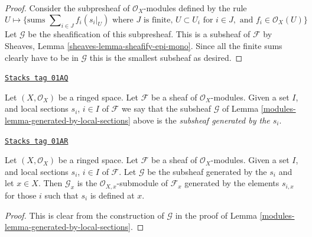 \begin{proof}
Consider the subpresheaf of $\mathcal{O}_X$-modules
defined by the rule
$$
U
\longmapsto
\{
\text{sums } \sum\nolimits_{i \in J} f_i (s_i|_U)
\text{ where } J \text{ is finite, }
U \subset U_i \text{ for } i\in J, \text{ and }
f_i \in \mathcal{O}_X(U)
\}
$$
Let $\mathcal{G}$ be the sheafification of this subpresheaf.
This is a subsheaf of $\mathcal{F}$ by
Sheaves, Lemma \ref{sheaves-lemma-sheafify-epi-mono}.
Since all the finite sums clearly have to be in $\mathcal{G}$
this is the smallest subsheaf as desired.
\end{proof}

\begin{definition}
\label{modules-definition-generated-by-local-sections}
\href{https://stacks.math.columbia.edu/tag/01AQ}{\texttt{Stacks tag 01AQ}}

Let $(X, \mathcal{O}_X)$ be a ringed space.
Let $\mathcal{F}$ be a sheaf of $\mathcal{O}_X$-modules.
Given a set $I$, and
local sections $s_i$, $i \in I$ of $\mathcal{F}$
we say that the subsheaf $\mathcal{G}$ of
Lemma \ref{modules-lemma-generated-by-local-sections}
above is the {\it subsheaf generated by the $s_i$}.
\end{definition}

\begin{lemma}
\label{modules-lemma-generated-by-local-sections-stalk}
\href{https://stacks.math.columbia.edu/tag/01AR}{\texttt{Stacks tag 01AR}}

Let $(X, \mathcal{O}_X)$ be a ringed space.
Let $\mathcal{F}$ be a sheaf of $\mathcal{O}_X$-modules.
Given a set $I$, and
local sections $s_i$, $i \in I$ of $\mathcal{F}$.
Let $\mathcal{G}$ be the subsheaf generated by the
$s_i$ and let $x\in X$.
Then $\mathcal{G}_x$ is the $\mathcal{O}_{X, x}$-submodule of
$\mathcal{F}_x$ generated by the elements $s_{i, x}$
for those $i$ such that $s_i$ is defined at $x$.
\end{lemma}

\begin{proof}

This is clear from the construction of $\mathcal{G}$
in the proof of Lemma \ref{modules-lemma-generated-by-local-sections}.
\end{proof}

